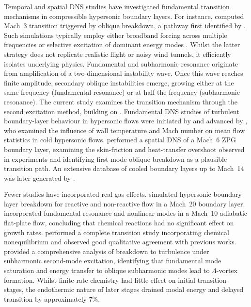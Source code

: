 Temporal and spatial \gls{DNS} studies have investigated fundamental transition mechanisms in compressible hypersonic boundary layers. For instance, \citet{Mayer2011} computed Mach~3 transition triggered by oblique breakdown, a pathway first identified by \citet{Fasel1993}. Such simulations typically employ either broadband forcing across multiple frequencies or selective excitation of dominant energy modes \citep{AlamSandham2000,Bhaskaran2011}. Whilst the latter strategy does not replicate realistic flight or noisy wind tunnels, it efficiently isolates underlying physics. Fundamental and subharmonic resonance originate from amplification of a two-dimensional instability wave. Once this wave reaches finite amplitude, secondary oblique instabilities emerge, growing either at the same frequency (fundamental resonance) or at half the frequency (subharmonic resonance). The current study examines the transition mechanism through the second excitation method, building on . Fundamental \gls{DNS} studies of turbulent boundary-layer behaviour in hypersonic flows were initiated by \citet{Martin2007} and advanced by \citet{Duan2011}, who examined the influence of wall temperature and Mach number on mean flow statistics in cold hypersonic flows. \citet{Franko2013} performed a spatial \gls{DNS} of a Mach~6 \gls{ZPG} boundary layer, examining the skin-friction and heat-transfer overshoot observed in experiments and identifying first-mode oblique breakdown as a plausible transition path. An extensive database of cooled boundary layers up to Mach~14 was later generated by \citet{Zhangetal2018}.

Fewer studies have incorporated real gas effects. \citet{Stemmer2005} simulated hypersonic boundary layer breakdown for reactive and non-reactive flow in a Mach~20 boundary layer. \citet{Marxenetal2013,Marxenetal2014} incorporated fundamental resonance and nonlinear modes in a Mach~10 adiabatic flat-plate flow, concluding that chemical reactions had no significant effect on growth rates. \citet{DiRenzo2021} performed a complete transition study incorporating chemical nonequilibrium and observed good qualitative agreement with previous works. \citet{Passiatoreetal2021} provided a comprehensive analysis of breakdown to turbulence under subharmonic second-mode excitation, identifying that fundamental mode saturation and energy transfer to oblique subharmonic modes lead to $\Lambda$-vortex formation. Whilst finite-rate chemistry had little effect on initial transition stages, the endothermic nature of later stages drained modal energy and delayed transition by approximately 7\%.

